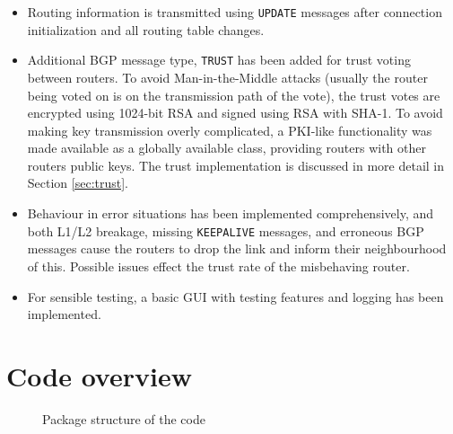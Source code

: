 \documentclass[11pt,a4paper,titlepage]{report}
\begin{document}
\begin{itemize}
\item Routing information is transmitted using \texttt{UPDATE} messages after connection initialization and all routing table changes.
\item Additional BGP message type, \texttt{TRUST} has been added for trust voting between routers. To avoid Man-in-the-Middle attacks (usually the router being voted on is on the transmission path of the vote), the trust votes are encrypted using 1024-bit RSA and signed using RSA with SHA-1. To avoid making key transmission overly complicated, a PKI-like functionality was made available as a globally available class, providing routers with other routers public keys. The trust implementation is discussed in more detail in Section \ref{sec:trust}.
\item Behaviour in error situations has been implemented comprehensively, and both L1/L2 breakage, missing \texttt{KEEPALIVE} messages, and erroneous BGP messages cause the routers to drop the link and inform their neighbourhood of this. Possible issues effect the trust rate of the misbehaving router.
\item For sensible testing, a basic GUI with testing features and logging has been implemented.
\end{itemize}

\section{Code overview}\label{sec:hlo}

\begin{figure}
\caption{Package structure of the code}
\label{fig:packagestructure}
\end{figure}
\end{document}
